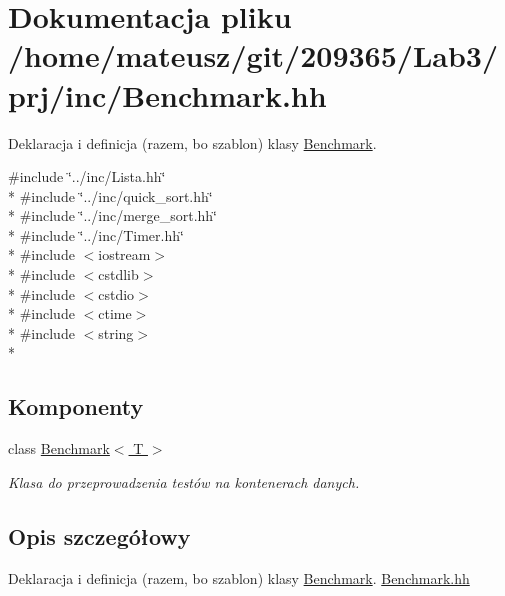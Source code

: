 \hypertarget{_benchmark_8hh}{\section{Dokumentacja pliku /home/mateusz/git/209365/\-Lab3/prj/inc/\-Benchmark.hh}
\label{_benchmark_8hh}
}


Deklaracja i definicja (razem, bo szablon) klasy \hyperlink{class_benchmark}{Benchmark}.  


{\ttfamily \#include \char`\"{}../inc/\-Lista.\-hh\char`\"{}}\\*
{\ttfamily \#include \char`\"{}../inc/quick\-\_\-sort.\-hh\char`\"{}}\\*
{\ttfamily \#include \char`\"{}../inc/merge\-\_\-sort.\-hh\char`\"{}}\\*
{\ttfamily \#include \char`\"{}../inc/\-Timer.\-hh\char`\"{}}\\*
{\ttfamily \#include $<$iostream$>$}\\*
{\ttfamily \#include $<$cstdlib$>$}\\*
{\ttfamily \#include $<$cstdio$>$}\\*
{\ttfamily \#include $<$ctime$>$}\\*
{\ttfamily \#include $<$string$>$}\\*
\subsection*{Komponenty}
\begin{DoxyCompactItemize}
\item 
class \hyperlink{class_benchmark}{Benchmark$<$ T $>$}
\begin{DoxyCompactList}\small\item\em Klasa do przeprowadzenia testów na kontenerach danych. \end{DoxyCompactList}\end{DoxyCompactItemize}


\subsection{Opis szczegółowy}
Deklaracja i definicja (razem, bo szablon) klasy \hyperlink{class_benchmark}{Benchmark}. \hyperlink{_benchmark_8hh}{Benchmark.\-hh} 